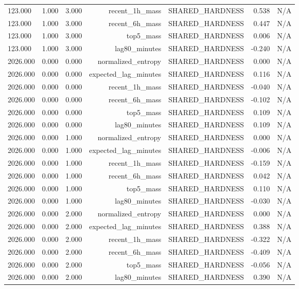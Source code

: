\begin{table}[h!]
\begin{tabular}{lrrrrrr}
123.000 & 1.000 & 3.000 & recent\_1h\_mass & SHARED\_HARDNESS & 0.538 & N/A \\
123.000 & 1.000 & 3.000 & recent\_6h\_mass & SHARED\_HARDNESS & 0.447 & N/A \\
123.000 & 1.000 & 3.000 & top5\_mass & SHARED\_HARDNESS & 0.006 & N/A \\
123.000 & 1.000 & 3.000 & lag80\_minutes & SHARED\_HARDNESS & -0.240 & N/A \\
2026.000 & 0.000 & 0.000 & normalized\_entropy & SHARED\_HARDNESS & 0.000 & N/A \\
2026.000 & 0.000 & 0.000 & expected\_lag\_minutes & SHARED\_HARDNESS & 0.116 & N/A \\
2026.000 & 0.000 & 0.000 & recent\_1h\_mass & SHARED\_HARDNESS & -0.040 & N/A \\
2026.000 & 0.000 & 0.000 & recent\_6h\_mass & SHARED\_HARDNESS & -0.102 & N/A \\
2026.000 & 0.000 & 0.000 & top5\_mass & SHARED\_HARDNESS & 0.109 & N/A \\
2026.000 & 0.000 & 0.000 & lag80\_minutes & SHARED\_HARDNESS & 0.109 & N/A \\
2026.000 & 0.000 & 1.000 & normalized\_entropy & SHARED\_HARDNESS & 0.000 & N/A \\
2026.000 & 0.000 & 1.000 & expected\_lag\_minutes & SHARED\_HARDNESS & -0.006 & N/A \\
2026.000 & 0.000 & 1.000 & recent\_1h\_mass & SHARED\_HARDNESS & -0.159 & N/A \\
2026.000 & 0.000 & 1.000 & recent\_6h\_mass & SHARED\_HARDNESS & 0.042 & N/A \\
2026.000 & 0.000 & 1.000 & top5\_mass & SHARED\_HARDNESS & 0.110 & N/A \\
2026.000 & 0.000 & 1.000 & lag80\_minutes & SHARED\_HARDNESS & -0.030 & N/A \\
2026.000 & 0.000 & 2.000 & normalized\_entropy & SHARED\_HARDNESS & 0.000 & N/A \\
2026.000 & 0.000 & 2.000 & expected\_lag\_minutes & SHARED\_HARDNESS & 0.388 & N/A \\
2026.000 & 0.000 & 2.000 & recent\_1h\_mass & SHARED\_HARDNESS & -0.322 & N/A \\
2026.000 & 0.000 & 2.000 & recent\_6h\_mass & SHARED\_HARDNESS & -0.409 & N/A \\
2026.000 & 0.000 & 2.000 & top5\_mass & SHARED\_HARDNESS & -0.056 & N/A \\
2026.000 & 0.000 & 2.000 & lag80\_minutes & SHARED\_HARDNESS & 0.390 & N/A \\

\end{tabular}
\end{table}
